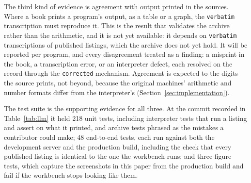 The third kind of evidence is agreement with output printed in the sources. Where a book prints a program's output, as a table or a graph, the \texttt{verbatim} transcription must reproduce it. This is the result that validates the archive rather than the arithmetic, and it is not yet available: it depends on \texttt{verbatim} transcriptions of published listings, which the archive does not yet hold. It will be reported per program, and every disagreement treated as a finding: a misprint in the book, a transcription error, or an interpreter defect, each resolved on the record through the \texttt{corrected} mechanism. Agreement is expected to the digits the source prints, not beyond, because the original machines' arithmetic and number formats differ from the interpreter's (Section~\ref{sec:implementation}).

The test suite is the supporting evidence for all three. At the commit recorded in Table~\ref{tab:llm} it held 218 unit tests, including interpreter tests that run a listing and assert on what it printed, and archive tests phrased as the mistakes a contributor could make; 48 end-to-end tests, each run against both the development server and the production build, including the check that every published listing is identical to the one the workbench runs; and three figure tests, which capture the screenshots in this paper from the production build and fail if the workbench stops looking like them.


